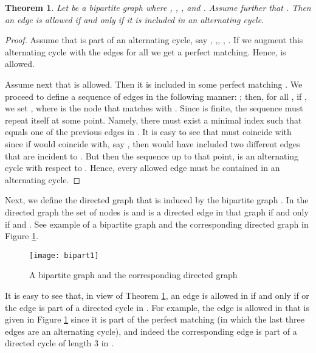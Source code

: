 \documentclass[times, 11pt]{article}
\newtheorem{theorem}{Theorem}[section]
\begin{document}
\begin{theorem}\label{prp34}
Let  be a bipartite graph where ,
, , and . Assume further
that .
Then an edge  is allowed if and only if
it is included in an alternating cycle.
\end{theorem}

\begin{proof} Assume that  is part of an alternating cycle, say
, ,, , .
If we augment this alternating cycle with the  edges  for all 
we get a perfect matching. Hence,  is allowed.

Assume next that  is allowed. Then it is included in some perfect matching .
We proceed to define a sequence of edges  in the following manner: ; then, for all , if ,
we set , where  is the node that  matches with .
Since  is finite, the sequence must repeat itself at some point. Namely, there must exist a minimal index 
such that  equals one of the previous edges in . It is easy to see that  must coincide with  since if  would coincide
with, say , then  would have included two different edges that are incident to . But then the sequence  up to that point,
 is an alternating cycle with respect to . Hence, every allowed edge must be contained in an alternating cycle.
\end{proof}

Next, we define the directed
graph  that is induced by the bipartite graph . In the directed graph  the set of nodes
is  and  is a directed edge in that graph
if and only if  and .
See example of a bipartite graph  and the corresponding directed graph  in Figure \ref{bipart1}.

\begin{figure}[h!!!]
\begin{center}
{\texttt{[image: bipart1]}}\caption{\label{bipart1} A bipartite graph  and the corresponding directed graph }
\end{center}
\end{figure}

It is easy to see that, in view of Theorem \ref{prp34},
an edge  is allowed in  if and only if  or the edge  is part of a directed cycle in .
For example, the edge  is allowed in  that is given in Figure \ref{bipart1}
since it is part of the perfect matching  (in which the
last three edges are an alternating cycle), and indeed the corresponding edge  is part of a directed cycle of length 3 in .
\end{document}
